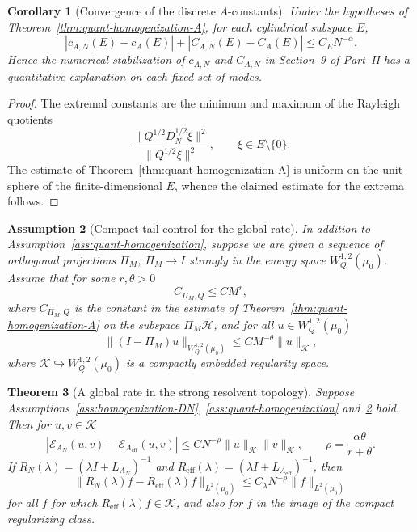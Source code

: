 \documentclass{article}
\newtheorem{theorem}{Theorem}[section]
\newtheorem{corollary}[theorem]{Corollary}
\newtheorem{assumption}[theorem]{Assumption}
\begin{document}
\begin{corollary}[Convergence of the discrete \(A\)-constants]
\label{cor:constants-rate}
Under the hypotheses of Theorem~\ref{thm:quant-homogenization-A}, for each
cylindrical subspace \(E\),
\[
        |c_{A,N}(E)-c_A(E)|+|C_{A,N}(E)-C_A(E)|
        \le C_E N^{-\alpha}.
\]
Hence the numerical stabilization of \(c_{A,N}\) and \(C_{A,N}\) in Section~9 of
Part~II has a quantitative explanation on each fixed set of modes.
\end{corollary}

\begin{proof}
The extremal constants are the minimum and maximum of the Rayleigh quotients
\[
        \frac{\|Q^{1/2}D_N^{1/2}\xi\|^2}{\|Q^{1/2}\xi\|^2},
        \qquad \xi\in E\setminus\{0\}.
\]
The estimate of Theorem~\ref{thm:quant-homogenization-A} is uniform on the
unit sphere of the finite-dimensional \(E\), whence the claimed estimate for
the extrema follows.
\end{proof}




\begin{assumption}[Compact-tail control for the global rate]
\label{ass:compact-tail-global}
In addition to Assumption~\ref{ass:quant-homogenization}, suppose we are given a
sequence of orthogonal projections \(\Pi_M\), \(\Pi_M\to I\) strongly in the
energy space \(W_Q^{1,2}(\mu_0)\). Assume that for some \(r,\theta>0\)
\[
        C_{\Pi_M,Q}\le C M^r,
\]
where \(C_{\Pi_M,Q}\) is the constant in the estimate of
Theorem~\ref{thm:quant-homogenization-A} on the subspace \(\Pi_M\mathcal H\),
and for all \(u\in W_Q^{1,2}(\mu_0)\)
\[
        \|(I-\Pi_M)u\|_{W_Q^{1,2}(\mu_0)}\le C M^{-\theta}\|u\|_{\mathcal K},
\]
where \(\mathcal K\hookrightarrow W_Q^{1,2}(\mu_0)\) is a compactly embedded
regularity space.
\end{assumption}

\begin{theorem}[A global rate in the strong resolvent topology]
\label{thm:global-resolvent-rate}
Suppose Assumptions~\ref{ass:homogenization-DN}, \ref{ass:quant-homogenization}
and~\ref{ass:compact-tail-global} hold. Then for \(u,v\in\mathcal K\)
\[
        |\mathcal E_{A_N}(u,v)-\mathcal E_{A_{\mathrm{eff}}}(u,v)|\le C N^{-\rho}\|u\|_{\mathcal K}\|v\|_{\mathcal K},\qquad \rho=\frac{\alpha\theta}{r+\theta}.
\]
If \(R_N(\lambda)=(\lambda I+L_{A_N})^{-1}\) and \(R_{\mathrm{eff}}(\lambda)=(\lambda I+L_{A_{\mathrm{eff}}})^{-1}\), then
\[
        \|R_N(\lambda)f-R_{\mathrm{eff}}(\lambda)f\|_{L^2(\mu_0)}\le C_\lambda N^{-\rho}\|f\|_{L^2(\mu_0)}
\]
for all \(f\) for which \(R_{\mathrm{eff}}(\lambda)f\in\mathcal K\), and also for \(f\) in the image of the compact regularizing class.
\end{theorem}
\end{document}
